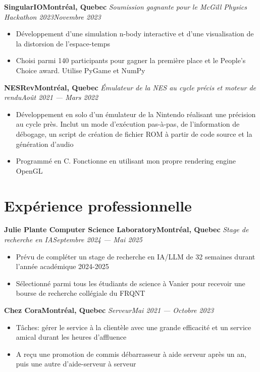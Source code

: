 \documentclass{article}
\newcommand{\newrole}[4]{
    {\normalfont\bfseries #1\hfill#3}
    \newline
    \textit{#2}\hfill\textit{#4}
}
\newenvironment{bulletpoints}{\vspace*{-0.2em}\begin{itemize}\setlength\itemsep{-0.3em}}{\end{itemize}}
\begin{document}
\newrole{SingularIO}{Soumission gagnante pour le McGill Physics Hackathon 2023}{Montréal, Quebec}{Novembre 2023}
\begin{bulletpoints}
    \item Développement d’une simulation n-body interactive et d’une visualisation de la distorsion de l’espace-temps
    \item Choisi parmi 140 participants pour gagner la première place et le People’s Choice award. Utilise PyGame et NumPy
\end{bulletpoints}

\newrole{NESRev}{Émulateur de la NES au cycle précis et moteur de rendu}{Montréal, Quebec}{Août 2021 --- Mars 2022}
\begin{bulletpoints}
    \item Développement en solo d’un émulateur de la Nintendo réalisant une précision au cycle près. Inclut un mode d’exécution pas-à-pas, de l’information de débogage, un script de création de fichier ROM à partir de code source et la génération d’audio
    \item Programmé en C. Fonctionne en utilisant mon propre rendering engine OpenGL
\end{bulletpoints}

\section*{Expérience professionnelle}

\newrole{Julie Plante Computer Science Laboratory}{Stage de recherche en IA}{Montréal, Quebec}{Septembre 2024 --- Mai 2025}
\begin{bulletpoints}
    \item Prévu de compléter un stage de recherche en IA/LLM de 32 semaines durant l’année académique 2024-2025
    \item Sélectionné parmi tous les étudiants de science à Vanier pour recevoir une bourse de recherche collégiale du FRQNT
\end{bulletpoints}

\newrole{Chez Cora}{Serveur}{Montréal, Quebec}{Mai 2021 --- Octobre 2023}
\begin{bulletpoints}
    \item Tâches: gérer le service à la clientèle avec une grande efficacité et un service amical durant les heures d’affluence
    \item A reçu une promotion de commis débarrasseur à aide serveur après un an, puis une autre d’aide-serveur à serveur
\end{bulletpoints}
\end{document}
